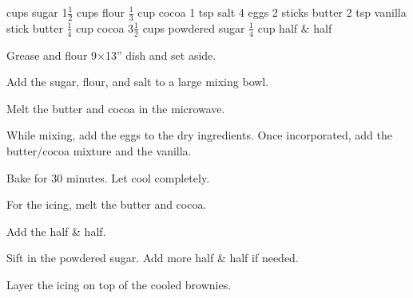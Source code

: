 \dishtype{}
\begin{ingreds}
     cups sugar
        1$\frac{1}{2}$ cups flour
        $\frac{1}{3}$ cup cocoa 
        1 tsp salt
        4 eggs
        2 sticks butter
        2 tsp vanilla
    \columnbreak{}
     stick butter
        $\frac{1}{4}$ cup cocoa
        3$\frac{1}{2}$ cups powdered sugar
        $\frac{1}{4}$ cup half \& half
\end{ingreds}
\begin{method}
    Grease and flour 9$\times$13'' dish and set aside.\par
    Add the sugar, flour, and salt to a large mixing bowl.\par
    Melt the butter and cocoa in the microwave.\par
    While mixing, add the eggs to the dry ingredients. Once incorporated, add the butter/cocoa mixture and the vanilla.\par
    Bake for 30 minutes. Let cool completely.\par
    For the icing, melt the butter and cocoa.\par
    Add the half \& half.\par
    Sift in the powdered sugar. Add more half \& half if needed.\par
    Layer the icing on top of the cooled brownies.    
\end{method}